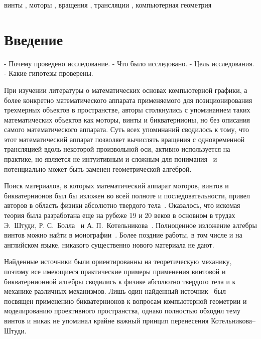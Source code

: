 \documentclass[%
]{ittmm}
\begin{document}
\begin{keywords}
  винты \sep
  моторы \sep
  вращения \sep
  трансляции \sep
  компьютерная геометрия
\end{keywords}

\maketitle

\section{Введение}
\label{sec:intro}

- Почему проведено исследование.
- Что было исследовано.
- Цель исследования.
- Какие гипотезы проверены.

При изучении литературы о математических основах компьютерной графики, а более конкретно математического аппарата применяемого для позиционирования трехмерных объектов в пространстве, авторы столкнулись с упоминанием таких математических объектов как моторы, винты и бикватернионы, но без описания самого математического аппарата. Суть всех упоминаний сводилось к тому, что этот математический аппарат позволяет вычислять вращения с одновременной трансляцией вдоль некоторой произвольной оси, активно используется на практике, но является не интуитивным и сложным для понимания~\cite{Lengyel:GameEngine:v1:2016} и потенциально может быть заменен геометрической алгеброй.

Поиск материалов, в которых математический аппарат моторов, винтов и бикватернионов был бы изложен во всей полноте и последовательности, привел авторов в область физики абсолютно твердого тела~\cite{Chelnokov:2006}. Оказалось, что искомая теория была разработана еще на рубеже 19 и 20 веков в основном в трудах Э.~Штуди, Р. С.~Болла~\cite[73]{KleinHoherGeometrie} и А. П.~Котельникова~\cite{Kotelnikov:2019}. Полноценное изложение алгебры винтов можно найти в монографии~\cite{Dimentberg:1965}. Более поздние работы, в том числе и на английском языке, никакого существенно нового материала не дают.

Найденные источники были ориентированны на теоретическую механику, поэтому все имеющиеся практические примеры применения винтовой и бикватернионной алгебры сводились к физике абсолютно твердого тела и к механике различных механизмов. Лишь один найденный источник~\cite{Goldman2024} был посвящен применению бикватернионов к вопросам компьютерной геометрии и моделированию проективного пространства, однако полностью обходил тему винтов и никак не упоминал крайне важный принцип перенесения Котельникова--Штуди.
\end{document}
